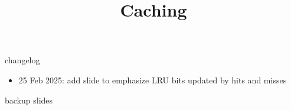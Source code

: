 \graphicspath{{./figures/}}
\title{Caching}
\date{}





{\changelogmode
\begin{frame}{changelog}
\begin{itemize}
\item 25 Feb 2025: add slide to emphasize LRU bits updated by hits and misses
\end{itemize}
\end{frame}
}



\begin{frame}{backup slides}
\end{frame}




